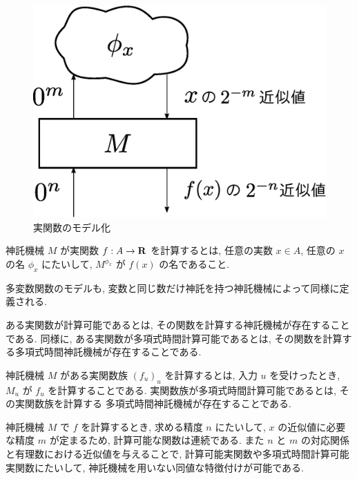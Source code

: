  \begin{figure}
  \label{fig:model-of-function}
  \begin{center}
   \includegraphics[height=0.15\textheight]{image/model-of-function.eps}
  \end{center}
  \caption{実関数のモデル化}
 \end{figure}

 \begin{definition}
  神託機械 $M$ が実関数 $f:A \to \mathbf R$ を計算するとは,
  任意の実数 $x \in A$, 任意の $x$ の名 $\phi_x$ にたいして,
  $M^{\phi_x}$ が $f(x)$ の名であること.
 \end{definition}

 多変数関数のモデルも, 変数と同じ数だけ神託を持つ神託機械によって同様に定義される.

 ある実関数が計算可能であるとは, その関数を計算する神託機械が存在することである.
 同様に, ある実関数が多項式時間計算可能であるとは, その関数を計算する多項式時間神託機械が存在することである.

 神託機械 $M$ がある実関数族 $(f_u)_u$ を計算するとは,
 入力 $u$ を受けったとき, $M_u$ が $f_u$ を計算することである.
 実関数族が多項式時間計算可能であるとは, その実関数族を計算する
 多項式時間神託機械が存在することである.
 

 神託機械 $M$ で $f$ を計算するとき, 求める精度 $n$ にたいして,
 $x$ の近似値に必要な精度 $m$ が定まるため,
 計算可能な関数は連続である.
 また $n$ と $m$ の対応関係と有理数における近似値を与えることで,
 計算可能実関数や多項式時間計算可能実関数にたいして,
 神託機械を用いない同値な特徴付けが可能である.

